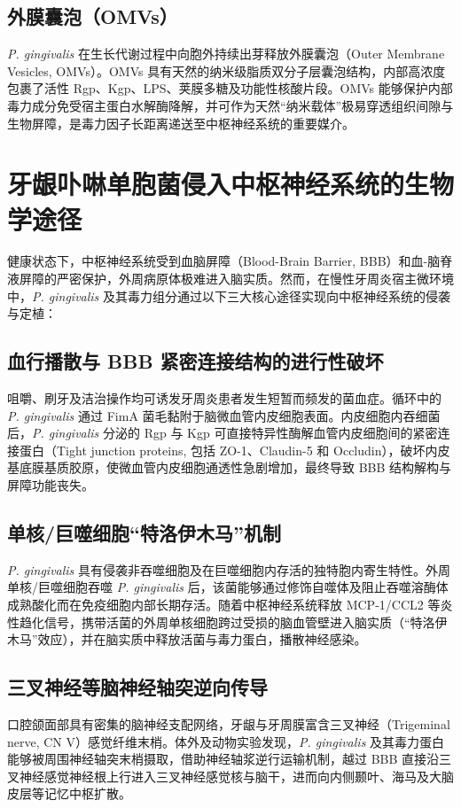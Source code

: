 \documentclass[12pt,a4paper]{ctexart}
\begin{document}
\subsection{外膜囊泡（OMVs）}
\textit{P. gingivalis} 在生长代谢过程中向胞外持续出芽释放外膜囊泡（Outer Membrane Vesicles, OMVs）。OMVs 具有天然的纳米级脂质双分子层囊泡结构，内部高浓度包裹了活性 Rgp、Kgp、LPS、荚膜多糖及功能性核酸片段。OMVs 能够保护内部毒力成分免受宿主蛋白水解酶降解，并可作为天然“纳米载体”极易穿透组织间隙与生物屏障，是毒力因子长距离递送至中枢神经系统的重要媒介\cite{ren2024}。

\section{牙龈卟啉单胞菌侵入中枢神经系统的生物学途径}

健康状态下，中枢神经系统受到血脑屏障（Blood-Brain Barrier, BBB）和血-脑脊液屏障的严密保护，外周病原体极难进入脑实质。然而，在慢性牙周炎宿主微环境中，\textit{P. gingivalis} 及其毒力组分通过以下三大核心途径实现向中枢神经系统的侵袭与定植：

\subsection{血行播散与 BBB 紧密连接结构的进行性破坏}
咀嚼、刷牙及洁治操作均可诱发牙周炎患者发生短暂而频发的菌血症。循环中的 \textit{P. gingivalis} 通过 FimA 菌毛黏附于脑微血管内皮细胞表面。内皮细胞内吞细菌后，\textit{P. gingivalis} 分泌的 Rgp 与 Kgp 可直接特异性酶解血管内皮细胞间的紧密连接蛋白（Tight junction proteins, 包括 ZO-1、Claudin-5 和 Occludin），破坏内皮基底膜基质胶原，使微血管内皮细胞通透性急剧增加，最终导致 BBB 结构解构与屏障功能丧失\cite{olsen2015, dominy2019}。

\subsection{单核/巨噬细胞“特洛伊木马”机制}
\textit{P. gingivalis} 具有侵袭非吞噬细胞及在巨噬细胞内存活的独特胞内寄生特性。外周单核/巨噬细胞吞噬 \textit{P. gingivalis} 后，该菌能够通过修饰自噬体及阻止吞噬溶酶体成熟酸化而在免疫细胞内部长期存活。随着中枢神经系统释放 MCP-1/CCL2 等炎性趋化信号，携带活菌的外周单核细胞跨过受损的脑血管壁进入脑实质（“特洛伊木马”效应），并在脑实质中释放活菌与毒力蛋白，播散神经感染\cite{nieran2019, ren2024}。

\subsection{三叉神经等脑神经轴突逆向传导}
口腔颌面部具有密集的脑神经支配网络，牙龈与牙周膜富含三叉神经（Trigeminal nerve, CN V）感觉纤维末梢。体外及动物实验发现，\textit{P. gingivalis} 及其毒力蛋白能够被周围神经轴突末梢摄取，借助神经轴浆逆行运输机制，越过 BBB 直接沿三叉神经感觉神经根上行进入三叉神经感觉核与脑干，进而向内侧颞叶、海马及大脑皮层等记忆中枢扩散\cite{nieran2019, olsen2015}。
\end{document}
